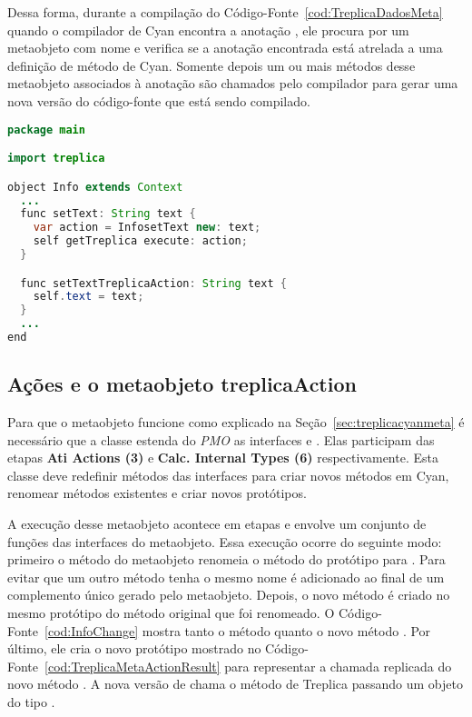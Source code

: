 Dessa forma, durante a compilação do Código-Fonte~\ref{cod:TreplicaDadosMeta} quando o compilador de Cyan encontra a anotação , ele procura por um metaobjeto com nome  e verifica se a anotação encontrada está atrelada a uma definição de método de Cyan. Somente depois um ou mais métodos desse metaobjeto associados à anotação são chamados pelo compilador para gerar uma nova versão do código-fonte que está sendo compilado.

\begin{lstlisting}[language=Java, caption={Protótipo \textbf{Info} modificado}, label={cod:InfoChange}]
package main

import treplica

object Info extends Context
  ...
  func setText: String text {
    var action = InfosetText new: text;
    self getTreplica execute: action;
  }

  func setTextTreplicaAction: String text {
    self.text = text;
  }
  ...
end
\end{lstlisting}

\subsection{Ações e o metaobjeto \textbf{treplicaAction}}

Para que o metaobjeto  funcione como explicado na Seção~\ref{sec:treplicacyanmeta} é necessário que a classe  estenda do \emph{PMO} as interfaces  e . Elas participam das etapas \textbf{Ati Actions (3)} e \textbf{Calc. Internal Types (6)} respectivamente. Esta classe deve redefinir métodos das interfaces para criar novos métodos em Cyan, renomear métodos existentes e criar novos protótipos.

A execução desse metaobjeto acontece em etapas e envolve um conjunto de funções das interfaces do metaobjeto. Essa execução ocorre do seguinte modo: primeiro o método  do metaobjeto  renomeia o método  do protótipo  para . Para evitar que um outro método tenha o mesmo nome é adicionado ao final de  um complemento único gerado pelo metaobjeto. Depois, o novo método  é criado no mesmo protótipo do método original que foi renomeado. O Código-Fonte~\ref{cod:InfoChange} mostra tanto o método  quanto o novo método . Por último, ele cria o novo protótipo  mostrado no Código-Fonte~\ref{cod:TreplicaMetaActionResult} para representar a chamada replicada do novo método . A nova versão de  chama o método  de Treplica passando um objeto do tipo .

